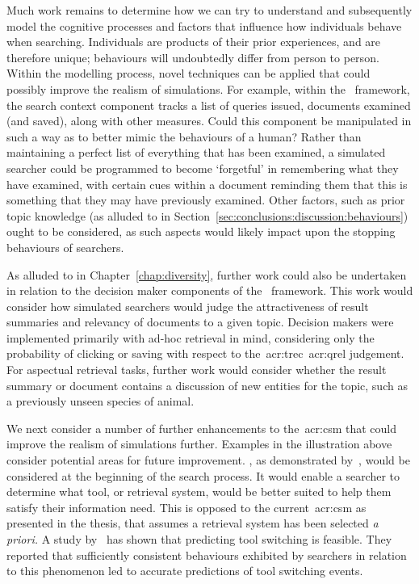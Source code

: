 Much work remains to determine how we can try to understand and subsequently model the cognitive processes and factors that influence how individuals behave when searching. Individuals are products of their prior experiences, and are therefore unique; behaviours will undoubtedly differ from person to person. Within the modelling process, novel techniques can be applied that could possibly improve the realism of simulations. For example, within the \simiir~framework, the search context component tracks a list of queries issued, documents examined (and saved), along with other measures. Could this component be manipulated in such a way as to better mimic the behaviours of a human? Rather than maintaining a perfect list of everything that has been examined, a simulated searcher could be programmed to become `forgetful' in remembering what they have examined, with certain cues within a document reminding them that this is something that they may have previously examined. Other factors, such as prior topic knowledge (as alluded to in Section~\ref{sec:conclusions:discussion:behaviours}) ought to be considered, as such aspects would likely impact upon the stopping behaviours of searchers.

As alluded to in Chapter~\ref{chap:diversity}, further work could also be undertaken in relation to the decision maker components of the \simiir~framework. This work would consider how simulated searchers would judge the attractiveness of result summaries and relevancy of documents to a given topic. Decision makers were implemented primarily with ad-hoc retrieval in mind, considering only the probability of clicking or saving with respect to the~\gls{acr:trec}~\gls{acr:qrel} judgement. For aspectual retrieval tasks, further work would consider whether the result summary or document contains a discussion of new entities for the topic, such as a previously unseen species of animal.

We next consider a number of further enhancements to the~\gls{acr:csm} that could improve the realism of simulations further. Examples in the illustration above consider potential areas for future improvement. , as demonstrated by~\cite{thomas2014modelling_behaviour}, would be considered at the beginning of the search process. It would enable a searcher to determine what tool, or retrieval system, would be better suited to help them satisfy their information need. This is opposed to the current~\gls{acr:csm} as presented in the thesis, that assumes a retrieval system has been selected \emph{a priori.} A study by~\cite{white2009tool_switching} has shown that predicting tool switching is feasible. They reported that sufficiently consistent behaviours exhibited by searchers in relation to this phenomenon led to accurate predictions of tool switching events.

